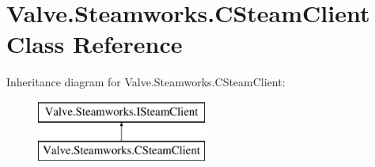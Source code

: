 \hypertarget{classValve_1_1Steamworks_1_1CSteamClient}{}\section{Valve.\+Steamworks.\+C\+Steam\+Client Class Reference}
\label{classValve_1_1Steamworks_1_1CSteamClient}
Inheritance diagram for Valve.\+Steamworks.\+C\+Steam\+Client\+:\begin{figure}[H]
\begin{center}
\leavevmode
\includegraphics[height=2.000000cm]{classValve_1_1Steamworks_1_1CSteamClient}
\end{center}
\end{figure}
